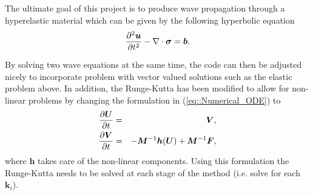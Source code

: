 The ultimate goal of this project is to produce wave propagation through a hyperelastic material which can be given by the following hyperbolic equation
\begin{equation}
  \label{eq::Elastic_wave}
  \frac{\partial^2 \bm{u}}{\partial t^2} - \nabla\cdot \bm{\sigma} = \bm{b}.
\end{equation}

By solving two wave equations at the same time, the code can then be adjusted nicely to incorporate problem with vector valued solutions such as the elastic problem above. In addition, the Runge-Kutta has been modified to allow for non-linear problems by changing the formulation in (\ref{eq::Numerical_ODE}) to
\begin{eqnarray}
  \label{eq::Numerical_ODE_New}
  \frac{\partial \bm{U}}{\partial t} & = & \bm{V}, \nonumber \\
  \frac{\partial \bm{V}}{\partial t} & = & -\bm{M}^{-1}\bm{h}(\bm{U}) + \bm{M}^{-1}\bm{F},
\end{eqnarray}
where $\bm{h}$ takes care of the non-linear components. Using this formulation the Runge-Kutta needs to be solved at each stage of the method (i.e. solve for each $\bm{k}_i$).
